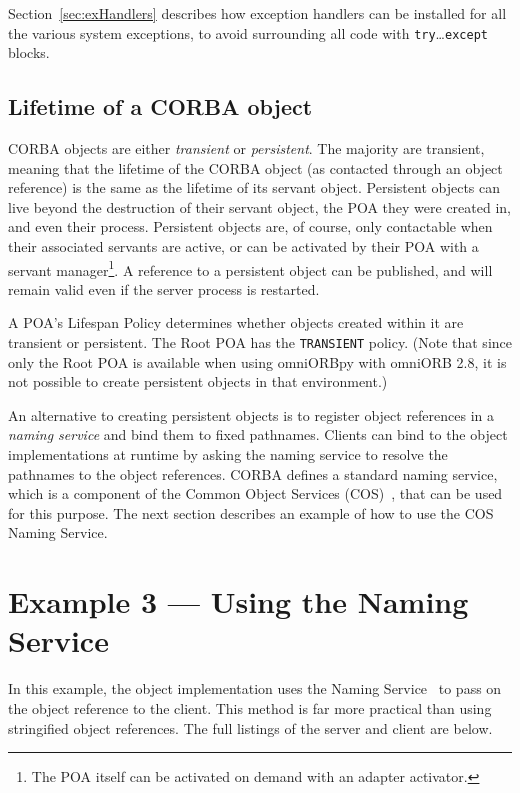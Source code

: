 \documentclass[11pt,twoside,a4paper]{book}
\newcommand{\code}[1]{\texttt{#1}}
\newcommand{\term}[1]{\textit{#1}}
\begin{document}
Section~\ref{sec:exHandlers} describes how exception handlers can be
installed for all the various system exceptions, to avoid surrounding
all code with \code{try}\dots\code{except} blocks.


\subsection{Lifetime of a CORBA object}

CORBA objects are either \term{transient} or \term{persistent}. The
majority are transient, meaning that the lifetime of the CORBA object
(as contacted through an object reference) is the same as the lifetime
of its servant object. Persistent objects can live beyond the
destruction of their servant object, the POA they were created in, and
even their process. Persistent objects are, of course, only
contactable when their associated servants are active, or can be
activated by their POA with a servant manager\footnote{The POA itself
can be activated on demand with an adapter activator.}. A reference to
a persistent object can be published, and will remain valid even if
the server process is restarted.

A POA's Lifespan Policy determines whether objects created within it
are transient or persistent. The Root POA has the \code{TRANSIENT}
policy. (Note that since only the Root POA is available when using
omniORBpy with omniORB 2.8, it is not possible to create persistent
objects in that environment.)

An alternative to creating persistent objects is to register object
references in a \term{naming service} and bind them to fixed
pathnames. Clients can bind to the object implementations at runtime
by asking the naming service to resolve the pathnames to the object
references. CORBA defines a standard naming service, which is a
component of the Common Object Services (COS)~\cite{corbaservices},
that can be used for this purpose. The next section describes an
example of how to use the COS Naming Service.



\section{Example 3 --- Using the Naming Service}
\label{sec:usingNS}

In this example, the object implementation uses the Naming
Service~\cite{corbaservices} to pass on the object reference to the
client.  This method is far more practical than using stringified
object references. The full listings of the server and client are
below.
\end{document}
